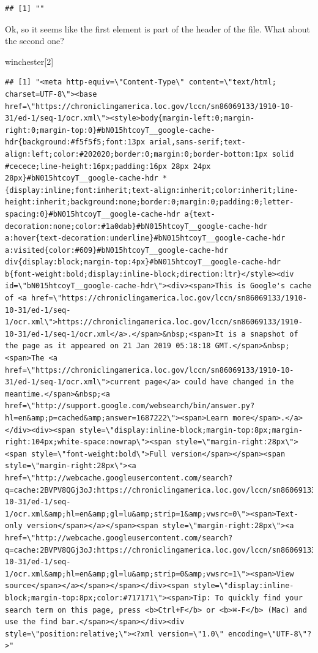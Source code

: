 \documentclass[
]{article}
\newenvironment{Shaded}{\begin{snugshade}}{\end{snugshade}}
\newcommand{\DecValTok}[1]{\textcolor[rgb]{0.00,0.00,0.81}{#1}}
\newcommand{\NormalTok}[1]{#1}
\begin{document}
\begin{verbatim}
## [1] ""
\end{verbatim}

Ok, so it seems like the first element is part of the header of the file. What about the second one?

\begin{Shaded}
\begin{Highlighting}[]
\NormalTok{winchester[}\DecValTok{2}\NormalTok{]}
\end{Highlighting}
\end{Shaded}

\begin{verbatim}
## [1] "<meta http-equiv=\"Content-Type\" content=\"text/html; charset=UTF-8\"><base href=\"https://chroniclingamerica.loc.gov/lccn/sn86069133/1910-10-31/ed-1/seq-1/ocr.xml\"><style>body{margin-left:0;margin-right:0;margin-top:0}#bN015htcoyT__google-cache-hdr{background:#f5f5f5;font:13px arial,sans-serif;text-align:left;color:#202020;border:0;margin:0;border-bottom:1px solid #cecece;line-height:16px;padding:16px 28px 24px 28px}#bN015htcoyT__google-cache-hdr *{display:inline;font:inherit;text-align:inherit;color:inherit;line-height:inherit;background:none;border:0;margin:0;padding:0;letter-spacing:0}#bN015htcoyT__google-cache-hdr a{text-decoration:none;color:#1a0dab}#bN015htcoyT__google-cache-hdr a:hover{text-decoration:underline}#bN015htcoyT__google-cache-hdr a:visited{color:#609}#bN015htcoyT__google-cache-hdr div{display:block;margin-top:4px}#bN015htcoyT__google-cache-hdr b{font-weight:bold;display:inline-block;direction:ltr}</style><div id=\"bN015htcoyT__google-cache-hdr\"><div><span>This is Google's cache of <a href=\"https://chroniclingamerica.loc.gov/lccn/sn86069133/1910-10-31/ed-1/seq-1/ocr.xml\">https://chroniclingamerica.loc.gov/lccn/sn86069133/1910-10-31/ed-1/seq-1/ocr.xml</a>.</span>&nbsp;<span>It is a snapshot of the page as it appeared on 21 Jan 2019 05:18:18 GMT.</span>&nbsp;<span>The <a href=\"https://chroniclingamerica.loc.gov/lccn/sn86069133/1910-10-31/ed-1/seq-1/ocr.xml\">current page</a> could have changed in the meantime.</span>&nbsp;<a href=\"http://support.google.com/websearch/bin/answer.py?hl=en&amp;p=cached&amp;answer=1687222\"><span>Learn more</span>.</a></div><div><span style=\"display:inline-block;margin-top:8px;margin-right:104px;white-space:nowrap\"><span style=\"margin-right:28px\"><span style=\"font-weight:bold\">Full version</span></span><span style=\"margin-right:28px\"><a href=\"http://webcache.googleusercontent.com/search?q=cache:2BVPV8QGj3oJ:https://chroniclingamerica.loc.gov/lccn/sn86069133/1910-10-31/ed-1/seq-1/ocr.xml&amp;hl=en&amp;gl=lu&amp;strip=1&amp;vwsrc=0\"><span>Text-only version</span></a></span><span style=\"margin-right:28px\"><a href=\"http://webcache.googleusercontent.com/search?q=cache:2BVPV8QGj3oJ:https://chroniclingamerica.loc.gov/lccn/sn86069133/1910-10-31/ed-1/seq-1/ocr.xml&amp;hl=en&amp;gl=lu&amp;strip=0&amp;vwsrc=1\"><span>View source</span></a></span></span></div><span style=\"display:inline-block;margin-top:8px;color:#717171\"><span>Tip: To quickly find your search term on this page, press <b>Ctrl+F</b> or <b>⌘-F</b> (Mac) and use the find bar.</span></span></div><div style=\"position:relative;\"><?xml version=\"1.0\" encoding=\"UTF-8\"?>"

\end{verbatim}
\end{document}
